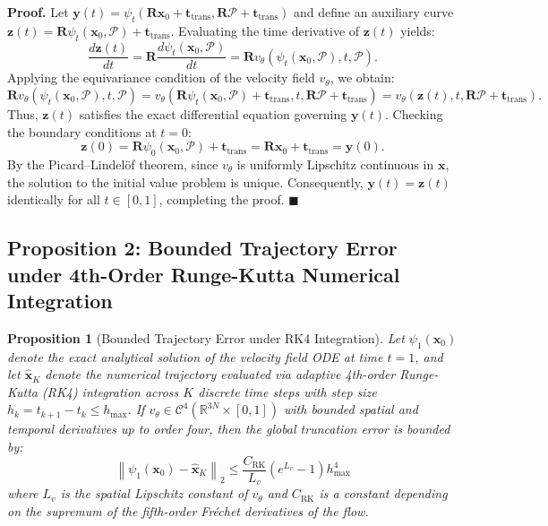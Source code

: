 \documentclass[11pt,a4paper]{article}
\newtheorem{proposition}{Proposition}
\begin{document}
\noindent\textbf{Proof.} Let $\mathbf{y}(t) = \psi_t(\mathbf{R}\mathbf{x}_0 + \mathbf{t}_{\text{trans}}, \mathbf{R}\mathcal{P} + \mathbf{t}_{\text{trans}})$ and define an auxiliary curve $\mathbf{z}(t) = \mathbf{R}\psi_t(\mathbf{x}_0, \mathcal{P}) + \mathbf{t}_{\text{trans}}$. Evaluating the time derivative of $\mathbf{z}(t)$ yields:
\begin{equation}
\frac{d\mathbf{z}(t)}{dt} = \mathbf{R} \frac{d\psi_t(\mathbf{x}_0, \mathcal{P})}{dt} = \mathbf{R} v_\theta(\psi_t(\mathbf{x}_0, \mathcal{P}), t, \mathcal{P}).
\end{equation}
Applying the equivariance condition of the velocity field $v_\theta$, we obtain:
\begin{equation}
\mathbf{R} v_\theta(\psi_t(\mathbf{x}_0, \mathcal{P}), t, \mathcal{P}) = v_\theta(\mathbf{R}\psi_t(\mathbf{x}_0, \mathcal{P}) + \mathbf{t}_{\text{trans}}, t, \mathbf{R}\mathcal{P} + \mathbf{t}_{\text{trans}}) = v_\theta(\mathbf{z}(t), t, \mathbf{R}\mathcal{P} + \mathbf{t}_{\text{trans}}).
\end{equation}
Thus, $\mathbf{z}(t)$ satisfies the exact differential equation governing $\mathbf{y}(t)$. Checking the boundary conditions at $t = 0$:
\begin{equation}
\mathbf{z}(0) = \mathbf{R}\psi_0(\mathbf{x}_0, \mathcal{P}) + \mathbf{t}_{\text{trans}} = \mathbf{R}\mathbf{x}_0 + \mathbf{t}_{\text{trans}} = \mathbf{y}(0).
\end{equation}
By the Picard--Lindel{\"o}f theorem, since $v_\theta$ is uniformly Lipschitz continuous in $\mathbf{x}$, the solution to the initial value problem is unique. Consequently, $\mathbf{y}(t) = \mathbf{z}(t)$ identically for all $t \in [0, 1]$, completing the proof. \hfill $\blacksquare$

\vspace{1em}

\subsection*{Proposition 2: Bounded Trajectory Error under 4th-Order Runge-Kutta Numerical Integration}
\begin{proposition}[Bounded Trajectory Error under RK4 Integration]
Let $\psi_1(\mathbf{x}_0)$ denote the exact analytical solution of the velocity field ODE at time $t = 1$, and let $\hat{\mathbf{x}}_K$ denote the numerical trajectory evaluated via adaptive 4th-order Runge-Kutta (RK4) integration across $K$ discrete time steps with step size $h_k = t_{k+1} - t_k \le h_{\max}$. If $v_\theta \in \mathcal{C}^4(\mathbb{R}^{3N} \times [0, 1])$ with bounded spatial and temporal derivatives up to order four, then the global truncation error is bounded by:
\begin{equation}
\left\| \psi_1(\mathbf{x}_0) - \hat{\mathbf{x}}_K \right\|_2 \le \frac{C_{\text{RK}}}{L_v} \left( e^{L_v} - 1 \right) h_{\max}^4
\end{equation}
where $L_v$ is the spatial Lipschitz constant of $v_\theta$ and $C_{\text{RK}}$ is a constant depending on the supremum of the fifth-order Fr{\'e}chet derivatives of the flow.
\end{proposition}
\end{document}
